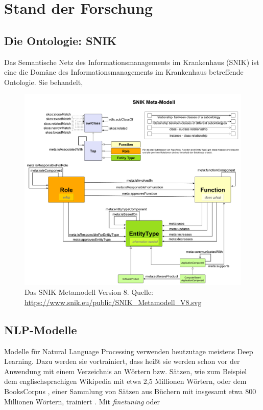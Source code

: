 \chapter{Stand der Forschung}\label{ch:relatedWork}

\section{Die Ontologie: SNIK}

Das Semantische Netz des Informationsmanagements im Krankenhaus (SNIK) ist eine die Domäne des Informationsmanagements im Krankenhaus betreffende Ontologie.
Sie behandelt,

\begin{figure}
\centering
\includegraphics[width=.8\textwidth, height=.9\textheight, keepaspectratio]{Images/snik-metamodel.pdf}
\caption[SNIK Metamodell Version 8]{Das SNIK Metamodell Version 8. Quelle: \url{https://www.snik.eu/public/SNIK_Metamodell_V8.svg}}
\label{fig:snik-metamodel}
\end{figure}

\section{NLP-Modelle}

Modelle für Natural Language Processing verwenden heutzutage meistens Deep Learning.
Dazu werden sie vortrainiert, dass heißt sie werden schon vor der Anwendung mit einem Verzeichnis an Wörtern bzw. Sätzen,
wie zum Beispiel dem englischsprachigen Wikipedia mit etwa 2,5 Millionen Wörtern,
oder dem BooksCorpus \citep{bookscorpus},
einer Sammlung von Sätzen aus Büchern mit insgesamt etwa 800 Millionen Wörtern,
trainiert \citep{BERT}.
Mit \emph{finetuning} oder  

